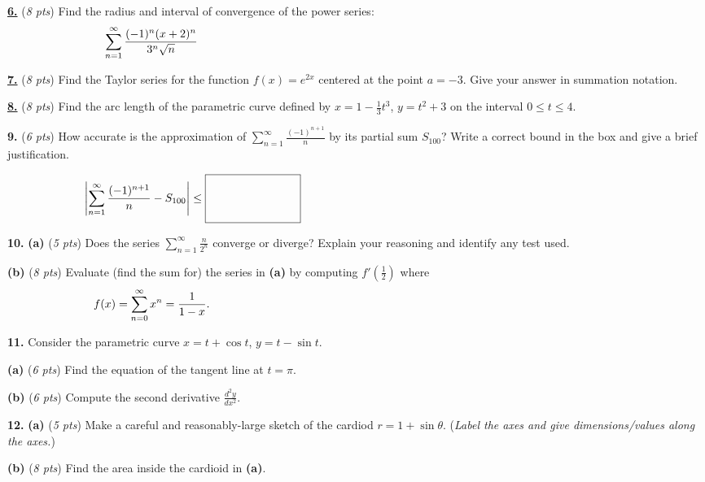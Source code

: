 \documentclass[11pt]{amsart}
\newcommand{\ds}{\displaystyle}
\newcommand{\prob}[1]{\bigskip\noindent\textbf{#1.} }
\newcommand{\cprob}[1]{\bigskip\noindent\underline{\textbf{#1.}} }
\newcommand{\pts}[1]{(\emph{#1 pts})}
\newcommand{\probpts}[2]{\prob{#1} \pts{#2} \quad}
\newcommand{\cprobpts}[2]{\cprob{#1} \pts{#2} \quad}
\newcommand{\ppartpts}[2]{\textbf{(#1)} \pts{#2} \quad}
\newcommand{\epartpts}[2]{\medskip\noindent \textbf{(#1)} \pts{#2} \quad}
\begin{document}
\clearpage\newpage
\cprobpts{6}{8}  Find the radius and interval of convergence of the power series:
    $$\sum_{n = 1}^\infty \frac{(-1)^n(x + 2)^n}{3^n\sqrt n} \hspace{5.0in}$$
\vfill

\cprobpts{7}{8}  Find the Taylor series for the function $f(x) = e^{2x}$ centered at the point $a = -3$. Give your answer in summation notation.
\vspace{3.0in}


\clearpage\newpage
\cprobpts{8}{8}  Find the arc length of the parametric curve defined by $\displaystyle x = 1 - \frac13t^3$, $y = t^2 + 3$ on the interval $0\leq t\le 4$.
\vfill

\probpts{9}{6}  How accurate is the approximation of $\ds \sum_{n=1}^\infty \frac{(-1)^{n+1}}{n}$ by its partial sum $S_{100}$?  Write a correct bound in the box and give a brief justification.

   $$\left|\sum_{n=1}^\infty \frac{(-1)^{n+1}}{n} - S_{100}\right| \le \boxed{\phantom{\begin{matrix} lakjsd alsfjd sadf \\ sdfa \\ sdaf \end{matrix}}} \hspace{4.0in}$$
\vspace{2.0in}


\clearpage\newpage
\prob{10} \ppartpts{a}{5}  Does the series $\ds \sum_{n=1}^\infty \frac{n}{2^n}$ converge or diverge?  Explain your reasoning and identify any test used.
\vspace{3.0in}

\epartpts{b}{8}  Evaluate (find the sum for) the series in \textbf{(a)} by computing $\ds f'\left(\frac{1}{2}\right)$ where
  $$f(x) = \sum_{n=0}^\infty x^n = \frac{1}{1-x}. \hspace{5.0in}$$
\vfill


\clearpage\newpage
\prob{11}  Consider the parametric curve $x = t + \cos t$, $y = t - \sin t$.

\epartpts{a}{6}  Find the equation of the tangent line at $t=\pi$.
\vfill

\epartpts{b}{6}  Compute the second derivative $\ds \frac{d^2 y}{dx^2}$.
\vfill


\clearpage\newpage
\prob{12} \ppartpts{a}{5}  Make a careful and reasonably-large sketch of the cardiod $r = 1 + \sin\theta$.  (\emph{Label the axes and give dimensions/values along the axes.})
\vfill

\epartpts{b}{8}  Find the area inside the cardioid in \textbf{(a)}.
\vfill
\end{document}
